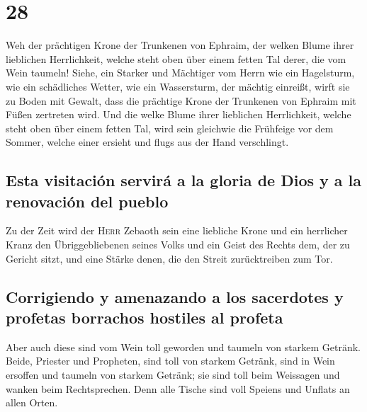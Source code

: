 \hypertarget{section-27}{%
\section{28}\label{section-27}}

 Weh der prächtigen Krone der Trunkenen von Ephraim, der
welken Blume ihrer lieblichen Herrlichkeit, welche steht oben über einem
fetten Tal derer, die vom Wein taumeln!  Siehe, ein
Starker und Mächtiger vom Herrn wie ein Hagelsturm, wie ein schädliches
Wetter, wie ein Wassersturm, der mächtig einreißt, wirft sie zu Boden
mit Gewalt,  dass die prächtige Krone der Trunkenen von
Ephraim mit Füßen zertreten wird.  Und die welke Blume
ihrer lieblichen Herrlichkeit, welche steht oben über einem fetten Tal,
wird sein gleichwie die Frühfeige vor dem Sommer, welche einer ersieht
und flugs aus der Hand verschlingt.

\hypertarget{esta-visitaciuxf3n-serviruxe1-a-la-gloria-de-dios-y-a-la-renovaciuxf3n-del-pueblo}{%
\subsection{Esta visitación servirá a la gloria de Dios y a la
renovación del
pueblo}\label{esta-visitaciuxf3n-serviruxe1-a-la-gloria-de-dios-y-a-la-renovaciuxf3n-del-pueblo}}

 Zu der Zeit wird der \textsc{Herr} Zebaoth sein eine
liebliche Krone und ein herrlicher Kranz den Übriggebliebenen seines
Volks  und ein Geist des Rechts dem, der zu Gericht sitzt,
und eine Stärke denen, die den Streit zurücktreiben zum Tor.

\hypertarget{corrigiendo-y-amenazando-a-los-sacerdotes-y-profetas-borrachos-hostiles-al-profeta}{%
\subsection{Corrigiendo y amenazando a los sacerdotes y profetas
borrachos hostiles al
profeta}\label{corrigiendo-y-amenazando-a-los-sacerdotes-y-profetas-borrachos-hostiles-al-profeta}}

 Aber auch diese sind vom Wein toll geworden und taumeln
von starkem Getränk. Beide, Priester und Propheten, sind toll von
starkem Getränk, sind in Wein ersoffen und taumeln von starkem Getränk;
sie sind toll beim Weissagen und wanken beim Rechtsprechen.
 Denn alle Tische sind voll Speiens und Unflats an allen
Orten.

